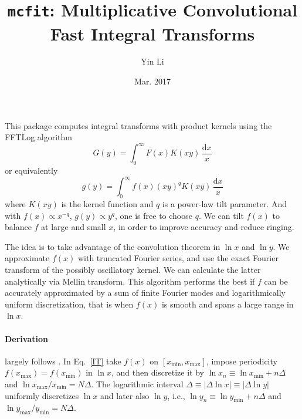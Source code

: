\documentclass{article}
\renewcommand{\d}{\mathrm{d}}
\newcommand{\xmin}{x_\textrm{min}}
\newcommand{\xmax}{x_\textrm{max}}
\newcommand{\ymin}{y_\textrm{min}}
\newcommand{\ymax}{y_\textrm{max}}
\begin{document}
\title{\texttt{mcfit}: Multiplicative Convolutional Fast Integral Transforms}
\author{Yin Li}
\date{Mar. 2017}
\maketitle


This package computes integral transforms with product kernels
using the FFTLog algorithm \cite{Talman78,Hamilton00}
\begin{equation}
    G(y) = \int_0^\infty F(x) K(xy) \,\frac{\d x}x
\end{equation}
or equivalently
\begin{equation}
    \label{IT}
    g(y) = \int_0^\infty f(x) (xy)^q K(xy) \,\frac{\d x}x
\end{equation}
where $K(xy)$ is the kernel function and $q$ is a power-law tilt parameter.
And with $f(x)\propto x^{-q}$, $g(y)\propto y^q$, one is free to choose $q$.
We can tilt $f(x)$ to balance $f$ at large and small $x$,
in order to improve accuracy and reduce ringing.

The idea is to take advantage of the convolution theorem in $\ln x$ and $\ln y$.
We approximate $f(x)$ with truncated Fourier series,
and use the exact Fourier transform of the possibly oscillatory kernel.
We can calculate the latter analytically via Mellin transform.
This algorithm performs the best if $f$ can be accurately approximated
by a sum of finite Fourier modes and logarithmically uniform discretization,
that is when $f(x)$ is smooth and spans a large range in $\ln x$.


\paragraph{Derivation} largely follows \cite{Hamilton00}.
In Eq.~\eqref{IT} take $f(x)$ on $[\xmin, \xmax]$, impose periodicity
$f(\xmax)=f(\xmin)$ in $\ln x$, and then discretize it by
$\ln x_n\equiv\ln\xmin+n\Delta$ and $\ln\xmax/\xmin=N\Delta$.
The logarithmic interval $\Delta\equiv|\Delta\ln x|\equiv|\Delta\ln y|$
uniformly discretizes $\ln x$ and later also $\ln y$,
i.e., $\ln y_n\equiv\ln\ymin+n\Delta$ and $\ln\ymax/\ymin=N\Delta$.
\end{document}
